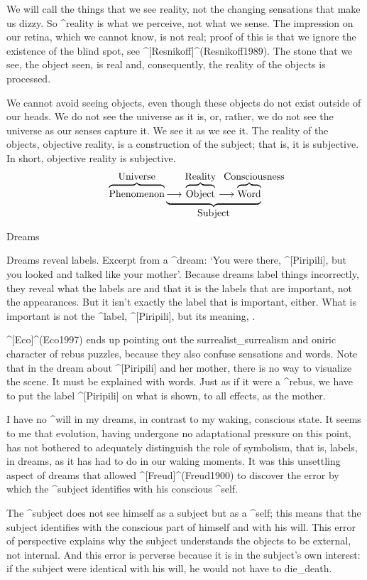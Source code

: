 We will call the things that we see reality, not the changing sensations
that make us dizzy. So ^{reality} is what we perceive, not what we
sense. The impression on our retina, which we cannot know, is not real;
proof of this is that we ignore the existence of the blind spot, see
^[Resnikoff]^(Resnikoff1989). The stone that we see, the object seen, is
real and, consequently, the reality of the objects is processed.

We cannot avoid seeing objects, even though these objects do not exist
outside of our heads. We do not see the universe as it is, or, rather,
we do not see the universe as our senses capture it. We see it as we see
it. The reality of the objects, objective reality, is a construction of
the subject; that is, it is subjective. In short, objective reality is
subjective.
$$\overbrace{\hbox{\strut Phenomenon}}^{\hbox{Universe}}
 \underbrace{\longrightarrow
  \overbrace{\hbox{\strut Object}}^{\setbox0=\hbox{Reality}\dp0=0pt\box0}
  \longrightarrow
  \overbrace{\hbox{\strut Word}}^{\hbox to 0pt{\hss\quad
   Consciousness\hss}}}_{\hbox{Subject}}$$


\Section Dreams

Dreams reveal labels. Excerpt from a ^{dream}: `You were there,
^[Piripili],  but you looked and talked like your mother'. Because
dreams label things incorrectly, they reveal what the labels are and
that it is the labels that are important, not the appearances. But it
isn't exactly the label that is important, either. What is important is
not the  ^{label}, ^[Piripili], but its meaning, .

^[Eco]^(Eco1997) ends up pointing out the surrealist_{surrealism} and
oniric character of rebus puzzles, because they also confuse sensations
and words. Note that in the dream about ^[Piripili] and her mother,
there is no way to visualize the scene. It must be explained with words.
Just as if it were a ^{rebus}, we have to put the label ^[Piripili] on
what is shown, to all effects, as the mother.

I have no ^{will} in my dreams, in contrast to my waking, conscious
state. It seems to me that evolution, having undergone no adaptational
pressure on this point, has not bothered to adequately distinguish the
role of symbolism, that is, labels, in dreams, as it has had to do in
our waking moments. It was this unsettling aspect of dreams that allowed
^[Freud]^(Freud1900) to discover the error by which the ^{subject}
identifies with his conscious ^{self}.

The ^{subject} does not see himself as a subject but as a ^{self}; this
means that the subject identifies with the conscious part of himself and
with his will. This error of perspective explains why the subject
understands the objects to be external, not internal. And this error is
perverse because it is in the subject's own interest: if the subject
were identical with his will, he would not have to die_{death}.


